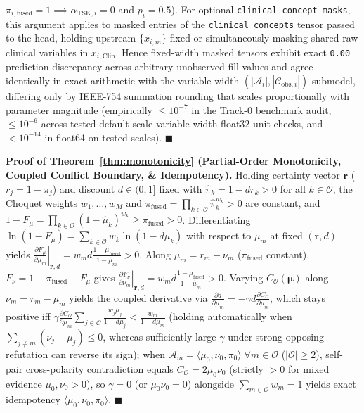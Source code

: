 \documentclass[10pt,twocolumn]{article}
\begin{document}
$\pi_{i,\text{fused}} = 1 \implies \alpha_{\text{TSK},i} = 0$ and $p_i = 0.5$). For
optional \texttt{clinical\_\allowbreak concept\_\allowbreak masks}, this argument applies to
masked entries of the \texttt{clinical\_\allowbreak concepts} tensor passed to the head,
holding upstream $\{x_{i,m}\}$ fixed or simultaneously masking shared raw clinical
variables in $x_{i,\text{Clin}}$. Hence fixed-width masked tensors exhibit exact \texttt{0.00}
prediction discrepancy across arbitrary
unobserved fill values and agree identically in exact arithmetic with the variable-width
$(|\mathcal{A}_i|, |\mathcal{C}_{\text{obs},i}|)$-submodel, differing only by IEEE-754
summation rounding that scales proportionally with parameter magnitude (empirically $\le
10^{-7}$ in the Track-0 benchmark audit, $\le 10^{-6}$ across tested default-scale
variable-width float32 unit checks, and $< 10^{-14}$ in float64 on tested scales).
$\blacksquare$

\noindent\textbf{Proof of Theorem~\ref{thm:monotonicity} (Partial-Order Monotonicity, Coupled
Conflict
Boundary, \& Idempotency).}
Holding certainty vector $\bm{r}$ ($r_j = 1 - \pi_j$) and discount $d \in (0, 1]$ fixed with
$\hat{\pi}_k = 1 - d r_k > 0$ for all $k \in \mathcal{O}$, the Choquet weights $w_1,\dots,w_M$
and $\pi_{\text{fused}} = \prod_{k\in\mathcal{O}}\hat{\pi}_k^{w_k} > 0$ are constant, and $1 -
F_\mu = \prod_{k\in\mathcal{O}}(1 - \hat{\mu}_k)^{w_k} \ge \pi_{\text{fused}} > 0$.
Differentiating $\ln(1 - F_\mu) = \sum_{k\in\mathcal{O}} w_k \ln(1 - d\mu_k)$ with respect to
$\mu_m$ at fixed $(\bm{r}, d)$ yields $\left.\frac{\partial F_\mu}{\partial
\mu_m}\right|_{\bm{r},d} = w_m d \frac{1-\mu_{\text{fused}}}{1-\hat{\mu}_m} > 0$. Along $\mu_m
= r_m - \nu_m$ ($\pi_{\text{fused}}$ constant), $F_\nu = 1 - \pi_{\text{fused}} - F_\mu$ gives
$\left.\frac{\partial F_\nu}{\partial \nu_m}\right|_{\bm{r},d} = w_m d
\frac{1-\mu_{\text{fused}}}{1-\hat{\mu}_m} > 0$. Varying $C_{\mathcal{O}}(\bm{\mu})$ along
$\nu_m = r_m - \mu_m$ yields the coupled derivative via $\frac{\partial d}{\partial \mu_m} =
-\gamma d \frac{\partial C_{\mathcal{O}}}{\partial \mu_m}$, which stays positive iff $\gamma
\frac{\partial C_{\mathcal{O}}}{\partial \mu_m}\sum_{j\in\mathcal{O}}\frac{w_j\mu_j}{1-d\mu_j}
< \frac{w_m}{1-d\mu_m}$ (holding automatically when $\sum_{j\neq m}(\nu_j-\mu_j)\le 0$, whereas
sufficiently large $\gamma$ under strong opposing refutation can reverse its sign); when
$\mathcal{A}_m = \langle \mu_0, \nu_0, \pi_0\rangle \;\forall m \in \mathcal{O}$
($|\mathcal{O}|\ge
2$), self-pair cross-polarity contradiction equals $C_{\mathcal{O}} = 2\mu_0\nu_0$ (strictly $>
0$
for mixed evidence $\mu_0,\nu_0 > 0$), so $\gamma = 0$ (or $\mu_0\nu_0=0$) alongside
$\sum_{m\in\mathcal{O}} w_m = 1$ yields exact idempotency $\langle \mu_0, \nu_0, \pi_0\rangle$.
$\blacksquare$
\end{document}

